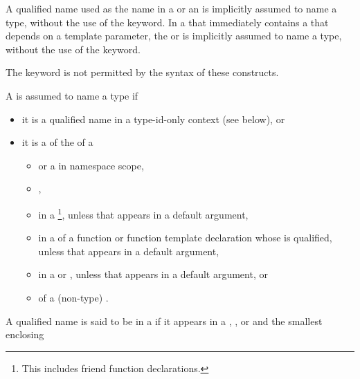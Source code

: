 \pnum
A qualified name used as the name in a
or an
is implicitly assumed to name a type, without the use of the
keyword.
In a  that immediately contains a 
that depends on a template parameter, the  or 
is implicitly assumed to name a type, without the use of the  keyword.
\begin{note}
The
keyword is not permitted by the syntax of these constructs.
\end{note}

\pnum
A 
is assumed to name a type if
\begin{itemize}
\item it is a qualified name in a type-id-only context (see below), or
\item it is a  of the  of a
\begin{itemize}
\item {} or a  in namespace scope,
\item {},
\item {} in a %
\footnote{This includes friend function declarations.},
unless that  appears in a default argument,
\item {} in a 
of a function or function template declaration
whose  is qualified,
unless that 
appears in a default argument,
\item {} in a 
or ,
unless that  appears in a default argument, or
\item {} of a (non-type) .
\end{itemize}
\end{itemize}
A qualified name is said to be in a 
if it appears in a
,
, or
and the smallest enclosing

